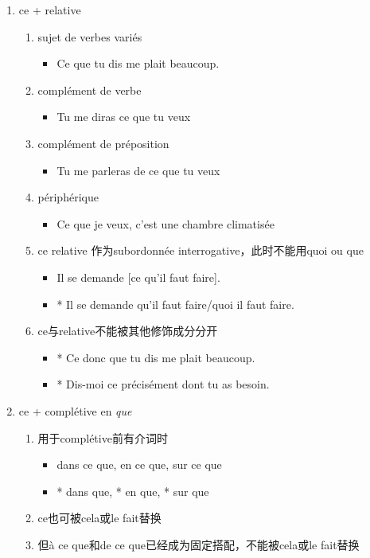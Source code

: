 \documentclass[UTF8]{report}
\begin{document}
\begin{enumerate}
    \item ce + relative
    \begin{enumerate}
        \item sujet de verbes variés
        \begin{itemize}
            \item Ce que tu dis me plait beaucoup.
        \end{itemize}
        \item complément de verbe 
        \begin{itemize}
            \item Tu me diras ce que tu veux
        \end{itemize}
        \item complément de préposition
        \begin{itemize}
            \item Tu me parleras de ce que tu veux
        \end{itemize}
        \item périphérique
        \begin{itemize}
            \item Ce que je veux, c’est une chambre climatisée
        \end{itemize}
        \item ce relative 作为subordonnée interrogative，此时不能用quoi ou que
        \begin{itemize}
            \item Il se demande [ce qu’il faut faire].
            \item * Il se demande qu’il faut faire/quoi il faut faire.
        \end{itemize}
        \item ce与relative不能被其他修饰成分分开
        \begin{itemize}
            \item * Ce donc que tu dis me plait beaucoup.
            \item * Dis-moi ce précisément dont tu as besoin.
        \end{itemize}
    \end{enumerate}
    \item ce + complétive en \textit{que}
    \begin{enumerate}
        \item 用于complétive前有介词时
        \begin{itemize}
            \item dans ce que, en ce que, sur ce que
            \item * dans que, * en que, * sur que
        \end{itemize}
        \item ce也可被cela或le fait替换
        \item 但à ce que和de ce que已经成为固定搭配，不能被cela或le fait替换
    \end{enumerate}
\end{enumerate}
\end{document}
